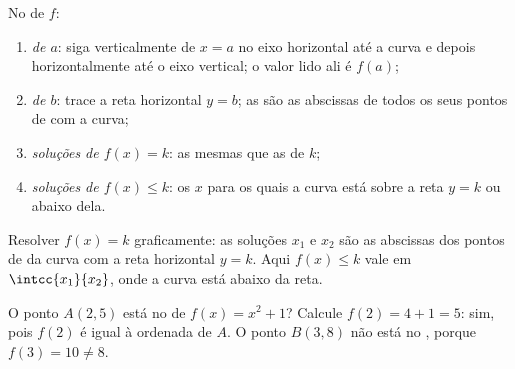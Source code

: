 \begin{method}\label{met:g10:functions:reading}
No  de $f$:
\begin{enumerate}
  \item \emph{ de $a$}: siga verticalmente de $x = a$ no eixo
        horizontal até a curva e depois horizontalmente até o eixo
        vertical; o valor lido ali é $f(a)$;
  \item \emph{ de $b$}: trace a reta horizontal $y = b$; as
         são as abscissas de todos os seus pontos de
         com a curva;
  \item \emph{soluções de $f(x) = k$}: as mesmas que as  de
        $k$;
  \item \emph{soluções de $f(x) \leq k$}: os $x$ para os quais a curva
        está sobre a reta $y = k$ ou abaixo dela.
\end{enumerate}
\end{method}

\begin{omfigure}

{\small Resolver $f(x) = k$ graficamente: as soluções $x_1$ e $x_2$ são as
abscissas dos pontos de  da curva com a reta horizontal
$y = k$. Aqui $f(x) \leq k$ vale em $\intcc{x_1}{x_2}$, onde a curva está
abaixo da reta.}
\end{omfigure}

\begin{example}\label{ex:g10:functions:membership}
O ponto $A(2, 5)$ está no  de $f(x) = x^2 + 1$? Calcule
$f(2) = 4 + 1 = 5$: sim, pois $f(2)$ é igual à ordenada de $A$. O ponto
$B(3, 8)$ não está no , porque $f(3) = 10 \neq 8$.
\end{example}

